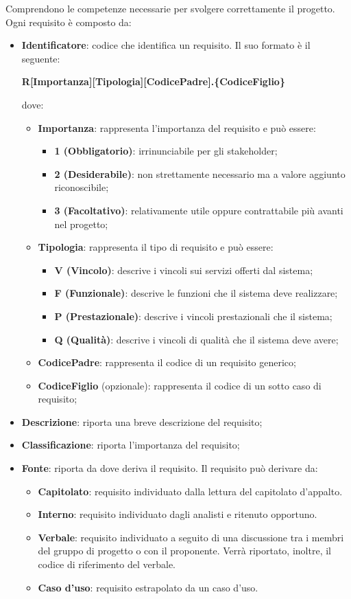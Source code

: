 Comprendono le competenze necessarie per svolgere correttamente il progetto.\\
Ogni requisito è composto da:
\begin{itemize}
\item \textbf{Identificatore}: codice che identifica un requisito. Il suo formato è il seguente:
\begin{center}
\textbf{R[Importanza][Tipologia][CodicePadre].\{CodiceFiglio\}}\\
\end{center}
dove:
\begin{itemize}
\item \textbf{Importanza}: rappresenta l'importanza del requisito e può essere:
\begin{itemize}
\item \textbf{1 (Obbligatorio)}: irrinunciabile per gli stakeholder;
\item \textbf{2 (Desiderabile)}: non strettamente necessario ma a valore aggiunto riconoscibile;
\item \textbf{3 (Facoltativo)}: relativamente utile oppure contrattabile più avanti nel progetto;
\end{itemize}
\item \textbf{Tipologia}: rappresenta il tipo di requisito e può essere:
\begin{itemize}
\item \textbf{V (Vincolo)}: descrive i vincoli sui servizi offerti dal sistema;
\item \textbf{F (Funzionale)}: descrive le funzioni che il sistema deve realizzare;
\item \textbf{P (Prestazionale)}: descrive i vincoli prestazionali che il sistema;
\item \textbf{Q (Qualità)}: descrive i vincoli di qualità che il sistema deve avere;
\end{itemize}
\item \textbf{CodicePadre}: rappresenta il codice di un requisito generico;
\item \textbf{CodiceFiglio} (opzionale): rappresenta il codice di un sotto caso di requisito;
\end{itemize}
\item \textbf{Descrizione}: riporta una breve descrizione del requisito;
\item \textbf{Classificazione}: riporta l'importanza del requisito;
\item \textbf{Fonte}: riporta da dove deriva il requisito. Il requisito può derivare da:
\begin{itemize}
\item \textbf{Capitolato}: requisito individuato dalla lettura del capitolato d'appalto.
\item \textbf{Interno}: requisito individuato dagli analisti e ritenuto opportuno.
\item \textbf{Verbale}: requisito individuato a seguito di una discussione tra i membri del gruppo di progetto o con il proponente. Verrà riportato, inoltre, il codice di riferimento del verbale.
\item \textbf{Caso d'uso}: requisito estrapolato da un caso d'uso.
\end{itemize}
\end{itemize}